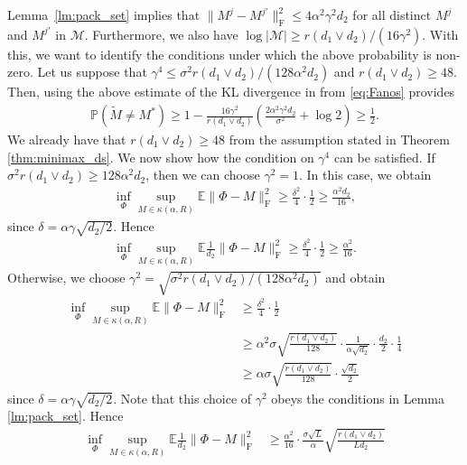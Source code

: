 \documentclass[11pt]{article}
\newcommand{\E}{\mathbb{E}}
\begin{document}
Lemma~\ref{lm:pack_set} implies that $\|M^j - M^{j'}\|_\mathrm{F}^2 \leq 4 \alpha^2 \gamma^2 d_2$ for all distinct $M^j$ and $M^{j'}$ in $\mathcal{M}$. 
Furthermore, we also have $\log |\mathcal{M}| \geq r(d_1 \vee d_2)/(16\gamma^2)$. With this, we want to identify the conditions under which the above probability is non-zero. Let us suppose that  $\gamma^4 \leq \sigma^2 r (d_1 \vee d_2) / (128 \alpha^2 d_2)$ and $r(d_1 \vee d_2) \geq 48$. Then, using the above estimate of the KL divergence in from \eqref{eq:Fanos} provides
\begin{align*}
    \mathbb{P} (\widetilde{M} \neq M^*)
    \geq 1 - \frac{16 \gamma^2}{r (d_1 \vee d_2)} \left(\frac{2 \alpha^2 \gamma^2 d_2}{\sigma^2} + \log 2\right)
    \geq \frac{1}{2}.
\end{align*} We already have that $r(d_1 \vee d_2) \geq 48$ from the assumption stated in Theorem \ref{thm:minimax_ds}. We now show how the condition on $\gamma^4$ can be satisfied. If $\sigma^2 r (d_1 \vee d_2) \geq 128 \alpha^2 d_2$, then we can choose $\gamma^2 = 1$. In this case, we obtain 
\begin{align*}
     \inf_{\Phi} \sup_{M \in \kappa(\alpha,R)} \E \|\Phi - M\|_\mathrm{F}^2 
     \geq \frac{\delta^2}{4} \cdot \frac{1}{2}
     \geq \frac{\alpha^2 d_2}{16},
\end{align*} 
since $\delta = \alpha\gamma\sqrt{d_2/2}$. 
Hence 
\begin{align*}
     \inf_{\Phi} \sup_{M \in \kappa(\alpha,R)} \E \frac{1}{d_2} \|\Phi - M\|_\mathrm{F}^2
     \geq \frac{\delta^2}{4} \cdot \frac{1}{2}
     \geq \frac{\alpha^2}{16}.
\end{align*} 
Otherwise, we choose $\gamma^2 = \sqrt{\sigma^2 r (d_1 \vee d_2)/(128 \alpha^2 d_2)}$ and obtain
\begin{align*}
     \inf_{\Phi} \sup_{M \in \kappa(\alpha,R)} \E \|\Phi - M\|_\mathrm{F}^2 & \geq \frac{\delta^2}{4} \cdot \frac{1}{2} \\
     & \geq \alpha^2 \sigma  \sqrt{\frac{r (d_1 \vee d_2)}{128}} \cdot \frac{1}{\alpha \sqrt{d_2}} \cdot \frac{d_2}{2} \cdot \frac{1}{4}\\
     & \geq \alpha \sigma \sqrt{\frac{r(d_1 \vee d_2)}{128}} \cdot \frac{\sqrt{d_2}}{2}
\end{align*} 
since $\delta = \alpha\gamma\sqrt{d_2/2}$. Note that this choice of $\gamma^2$ obeys the conditions in Lemma \ref{lm:pack_set}. 
Hence 
\begin{align*}
     \inf_{\Phi} \sup_{M \in \kappa(\alpha,R)} \E \frac{1}{d_2} \|\Phi - M\|_\mathrm{F}^2 & \geq \frac{\alpha^2}{16} \cdot \frac{\sigma\sqrt{L}}{\alpha} \sqrt{\frac{r(d_1 \vee d_2)}{L d_2}}
\end{align*} 
\end{document}

